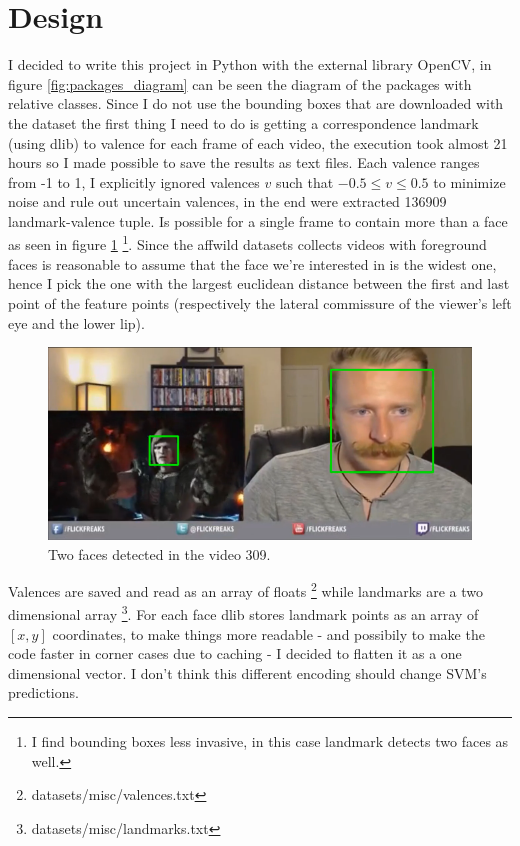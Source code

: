 \section{Design}
I decided to write this project in Python with the external library OpenCV, in figure \ref{fig:packages_diagram} can be seen the diagram of the packages with relative classes.
Since I do not use the bounding boxes that are downloaded with the dataset the first thing I need to do is getting a correspondence landmark (using dlib) to valence for each frame of each video, the execution took almost 21 hours so I made possible to save the results as text files.
Each valence ranges from -1 to 1, I explicitly ignored valences $v$ such that $-0.5 \leq v \leq 0.5 $ to minimize noise and rule out uncertain valences, in the end were extracted 136909 landmark-valence tuple.
Is possible for a single frame to contain more than a face as seen in figure \ref{fig:double_face} \footnote{I find bounding boxes less invasive, in this case landmark detects two faces as well.}.
Since the affwild datasets collects videos with foreground faces is reasonable to assume that the face we're interested in is the widest one, hence I pick the one with the largest euclidean distance between the first and last point of the feature points (respectively the lateral commissure of the viewer's left eye and the lower lip).

\begin{figure}
    \centering
    \includegraphics[scale=0.4]{images/309mp4_double_face.png}
    \caption{Two faces detected in the video 309.}
    \label{fig:double_face}
\end{figure}

Valences are saved and read as an array of floats \footnote{datasets/misc/valences.txt} while landmarks are a two dimensional array \footnote{datasets/misc/landmarks.txt}. 
For each face dlib stores landmark points as an array of $[x,y]$ coordinates, to make things more readable - and possibily to make the code faster in corner cases due to caching - I decided to flatten it as a one dimensional vector. 
I don't think this different encoding should change SVM's predictions.

